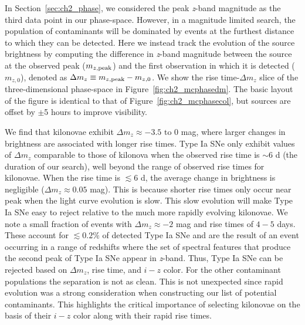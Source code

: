 In Section~\ref{sec:ch2_phase}, we considered the peak {\em z}-band magnitude as the third data point in our phase-space. However, in a magnitude limited search, the population of contaminants will be dominated by events at the furthest distance to which they can be detected. Here we instead track the evolution of the source brightness by computing the difference in {\em z}-band magnitude between the source at the observed peak ($m_{z,{\rm peak}}$) and the first observation in which it is detected ($m_{z,0}$), denoted as $\Delta m_z \equiv m_{z,{\rm peak}} - m_{z,0}$. We show the rise time-$\Delta m_z$ slice of the three-dimensional phase-space in Figure~\ref{fig:ch2_mcphasedm}. The basic layout of the figure is identical to that of Figure~\ref{fig:ch2_mcphasecol}, but sources are offset by $\pm$5 hours to improve visibility.

We find that kilonovae exhibit $\Delta m_z \approx -3.5\text{ to }0$ mag, where larger changes in brightness are associated with longer rise times. Type Ia SNe only exhibit values of $\Delta m_z$ comparable to those of kilonova when the observed rise time is $\sim6$ d (the duration of our search), well beyond the range of observed rise times for kilonovae. When the rise time is $\lesssim6$ d, the average change in brightness is negligible ($\Delta m_z \approx 0.05$ mag). This is because shorter rise times only occur near peak when the light curve evolution is slow. This slow evolution will make Type Ia SNe easy to reject relative to the much more rapidly evolving kilonovae. We note a small fraction of events with $\Delta m_z \approx -2$ mag and rise times of $4-5$ days. These account for $\lesssim0.2\%$ of detected Type Ia SNe and are the result of an event occurring in a range of redshifts where the set of spectral features that produce the second peak of Type Ia SNe appear in {\em z}-band. Thus, Type Ia SNe can be rejected based on $\Delta m_z$, rise time, and $i-z$ color. For the other contaminant populations the separation is not as clean. This is not unexpected since rapid evolution was a strong consideration when constructing our list of potential contaminants. This highlights the critical importance of selecting kilonovae on the basis of their $i-z$ color along with their rapid rise times.

